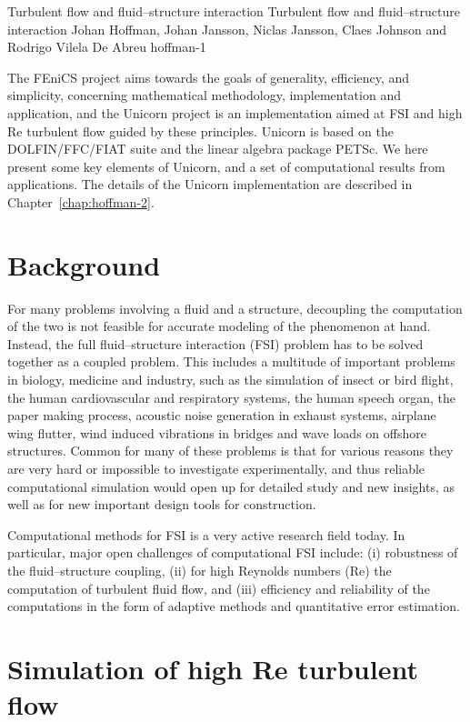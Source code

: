               {Turbulent flow and fluid--structure interaction}
              {Turbulent flow and fluid--structure interaction}
              {Johan Hoffman, Johan Jansson, Niclas Jansson, Claes Johnson and Rodrigo Vilela De Abreu}
              {hoffman-1}

The FEniCS project aims towards the goals of generality, efficiency,
and simplicity, concerning mathematical methodology, implementation
and application, and the Unicorn project is an implementation aimed at
FSI and high Re turbulent flow guided by these principles. Unicorn is
based on the DOLFIN/FFC/FIAT suite and the linear algebra package
PETSc. We here present some key elements of Unicorn, and a set of
computational results from applications. The details of the Unicorn
implementation are described in Chapter~\ref{chap:hoffman-2}.

\section{Background}

For many problems involving a fluid and a structure, decoupling the
computation of the two is not feasible for accurate modeling of the
phenomenon at hand. Instead, the full fluid--structure interaction (FSI)
problem has to be solved together as a coupled problem. This includes a
multitude of important problems in biology, medicine and industry, such
as the simulation of insect or bird flight, the human cardiovascular
and respiratory systems, the human speech organ, the paper making
process, acoustic noise generation in exhaust systems, airplane wing
flutter, wind induced vibrations in bridges and wave loads on offshore
structures. Common for many of these problems is that for various reasons
they are very hard or impossible to investigate experimentally, and thus
reliable computational simulation would open up for detailed study and
new insights, as well as for new important design tools for construction.

Computational methods for FSI is a very active research field today. In
particular, major open challenges of computational FSI include: (i)
robustness of the fluid--structure coupling, (ii) for high Reynolds
numbers (Re) the computation of turbulent fluid flow, and (iii) efficiency
and reliability of the computations in the form of adaptive methods and
quantitative error estimation.

\section{Simulation of high Re turbulent flow}


